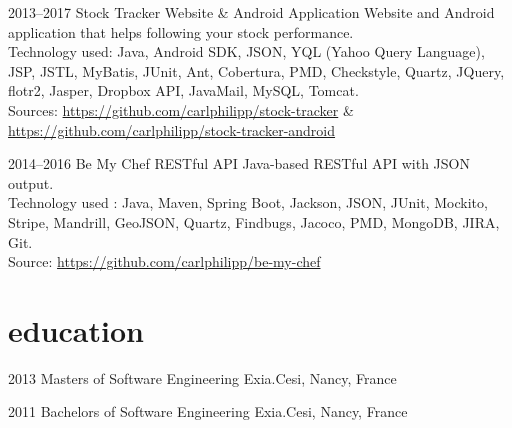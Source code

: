 \documentclass[]{friggeri-cv} %
\begin{document}
\begin{entrylist}

\entry
{2013--2017}
{}
{Stock Tracker}
{  Website \& Android Application}
{}
{Website and Android application that helps following your stock performance.\\
Technology used: Java, Android SDK, JSON, YQL (Yahoo Query Language), JSP, JSTL, MyBatis,
JUnit, Ant, Cobertura, PMD, Checkstyle, Quartz, JQuery, flotr2, Jasper, Dropbox API, JavaMail,
MySQL, Tomcat.\\
\footnotesize{Sources: \href{https://github.com/carlphilipp/stock-tracker}{https://github.com/carlphilipp/stock-tracker} \& \href{https://github.com/carlphilipp/stock-tracker}{https://github.com/carlphilipp/stock-tracker-android}}}

\end{entrylist}

\begin{entrylist}

\entry
{2014--2016}
{}
{Be My Chef}
{  RESTful API}
{}
{Java-based RESTful API with JSON output.\\
Technology used : Java, Maven, Spring Boot, Jackson, JSON, JUnit, Mockito, Stripe, Mandrill, GeoJSON, Quartz, Findbugs, Jacoco, PMD, MongoDB, JIRA, Git.\\
\footnotesize{Source: \href{https://github.com/carlphilipp/be-my-chef}{https://github.com/carlphilipp/be-my-chef}}
}

\end{entrylist}






\section{education}

\begin{entrylist}


\entry
{2013}
{}
{Masters {\normalfont of Software Engineering}}
{}
{Exia.Cesi, Nancy, France}
{}


\entry
{2011}
{}
{Bachelors {\normalfont of Software Engineering}}
{}
{Exia.Cesi, Nancy, France}
{}


\end{entrylist}
\end{document}
